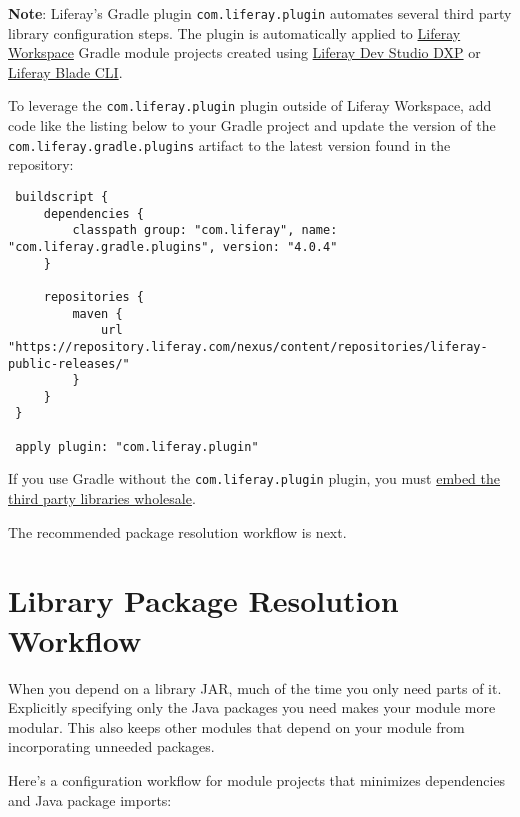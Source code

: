 \noindent\hrulefill

\textbf{Note}: Liferay's Gradle plugin \texttt{com.liferay.plugin}
automates several third party library configuration steps. The plugin is
automatically applied to
\href{/docs/7-2/reference/-/knowledge_base/r/liferay-workspace}{Liferay
Workspace} Gradle module projects created using
\href{/docs/7-2/reference/-/knowledge_base/r/liferay-dev-studio}{Liferay
Dev Studio DXP} or
\href{/docs/7-2/reference/-/knowledge_base/r/blade-cli}{Liferay Blade
CLI}.

To leverage the \texttt{com.liferay.plugin} plugin outside of Liferay
Workspace, add code like the listing below to your Gradle project and
update the version of the \texttt{com.liferay.gradle.plugins} artifact
to the latest version found in the repository:

\begin{verbatim}
 buildscript {
     dependencies {
         classpath group: "com.liferay", name: "com.liferay.gradle.plugins", version: "4.0.4"
     }

     repositories {
         maven {
             url "https://repository.liferay.com/nexus/content/repositories/liferay-public-releases/"
         }
     }
 }

 apply plugin: "com.liferay.plugin"
\end{verbatim}

If you use Gradle without the \texttt{com.liferay.plugin} plugin, you
must \hyperref[embedding-libraries-using-gradle]{embed the third party
libraries wholesale}.

\noindent\hrulefill

The recommended package resolution workflow is next.

\section{Library Package Resolution
Workflow}\label{library-package-resolution-workflow}

When you depend on a library JAR, much of the time you only need parts
of it. Explicitly specifying only the Java packages you need makes your
module more modular. This also keeps other modules that depend on your
module from incorporating unneeded packages.

Here's a configuration workflow for module projects that minimizes
dependencies and Java package imports:


